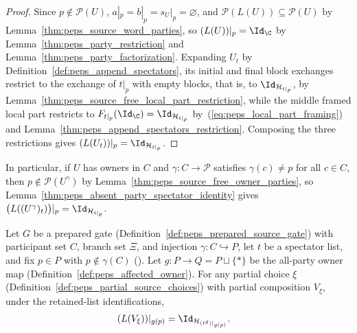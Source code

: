 \begin{proof}\leanok
    Since $p\notin\mathcal P(U)$, $a|_p=b|_p=s_U|_p=\varnothing$, and
    $\mathcal P(L(U))\subseteq\mathcal P(U)$ by Lemma~\ref{thm:peps_source_word_parties},
    so $(L(U))|_p=\Id_{\C}$ by Lemma~\ref{thm:peps_party_restriction} and
    Lemma~\ref{thm:peps_party_factorization}. Expanding $U_t$ by
    Definition~\ref{def:peps_append_spectators}, its initial and final block
    exchanges restrict to the exchange of $t|_p$ with empty blocks, that is, to
    $\Id_{\mathcal H_{t|_p}}$, by
    Lemma~\ref{thm:peps_source_free_local_part_restriction}, while the middle
    framed local part restricts to
    $F_{t|_p}(\Id_{\C})=\Id_{\mathcal H_{t|_p}}$ by~(\ref{eq:peps_local_part_framing})
    and Lemma~\ref{thm:peps_append_spectators_restriction}. Composing the
    three restrictions gives $(L(U_t))|_p=\Id_{\mathcal H_{t|_p}}$.
\end{proof}

In particular, if $U$ has owners in $C$ and $\gamma:C\to\mathcal P$ satisfies
$\gamma(c)\ne p$ for all $c\in C$, then $p\notin\mathcal P(U^\gamma)$ by
Lemma~\ref{thm:peps_source_free_owner_parties}, so
Lemma~\ref{thm:peps_absent_party_spectator_identity} gives
$\bigl(L((U^\gamma)_t)\bigr)|_p=\Id_{\mathcal H_{t|_p}}$.

\begin{lemma}
    \label{thm:peps_all_gate_nonincident_identity}
    \leanok
    Let $G$ be a prepared gate (Definition~\ref{def:peps_prepared_source_gate})
    with participant set $C$, branch set $\Xi$, and injection
    $\gamma:C\hookrightarrow P$, let $t$ be a spectator list, and fix $p\in P$
    with $p\notin\gamma(C)$ (\cite[proof of Theorem~5.2]{OpenAI2026PolynomialPEPS}).
    Let $g:P\to Q=P\sqcup\{*\}$ be the all-party owner map
    (Definition~\ref{def:peps_affected_owner}). For any partial choice $\xi$
    (Definition~\ref{def:peps_partial_source_choices}) with partial composition
    $V_\xi$, under the retained-list identifications,
    \begin{align}
        (L(V_\xi))|_{g(p)}
         & =\Id_{\mathcal H_{(t^g)|_{g(p)}}}.
        \label{eq:peps_all_gate_nonincident}
    \end{align}
\end{lemma}

